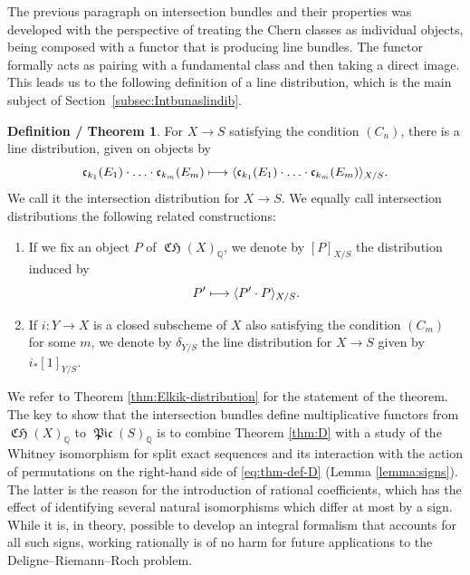 \documentclass[JEP,XML,SOM,Unicode,published]{cedram}
\newcommand\mto{\mathchoice{\longmapsto}{\mapsto}{\mapsto}{\mapsto}}
\theoremstyle{plain}
\theoremstyle{definition}
\newtheorem{defthm}[thm]{Definition / Theorem}
\newcommand{\QBbb}{\mathbb Q}
\newcommand{\cfrak}{\mathfrak c}
\DeclareMathOperator{\CHfrak}{\mathfrak{CH}}
\DeclareMathOperator{\Picfr}{\mathfrak{Pic}}
\begin{document}
The previous paragraph on intersection bundles and their properties was developed with the perspective of treating the Chern classes as individual objects, being composed with a functor that is producing line bundles. The functor formally acts as pairing with a fundamental class and then taking a direct image. This leads us to the following definition of a line distribution, which is the main subject of Section~\ref{subsec:Intbunaslindib}.

\begin{defthm}
For $X \to S$ satisfying the condition $(C_{n})$, there is a line distribution, given on objects by
\begin{equation}\label{eq:thm-def-D}
\cfrak_{k_1}(E_1) \cdot \ldots \cdot \cfrak_{k_m}(E_m) \mto \langle \cfrak_{k_1}(E_1) \cdot \ldots \cdot \cfrak_{k_m}(E_m) \rangle_{X/S}.
\end{equation}
We call it the intersection distribution for $X\to S$. We equally call intersection distributions the following related constructions:

\begin{enumerate}
\item If we fix an object $P$ of $\CHfrak(X)_\QBbb$, we denote by $[P]_{X/S}$ the distribution induced by
\begin{displaymath}
P^{\prime} \mto \langle P^{\prime} \cdot P \rangle_{X/S}.
\end{displaymath}
\item If $i\colon Y \to X$ is a closed subscheme of $X$ also satisfying the condition $(C_m)$ for some $m$, we denote by $\delta_{Y/S}$ the line distribution for $X\to S$ given by $ i_\ast [1]_{Y/S}$.
\end{enumerate}

\end{defthm}
We refer to Theorem \ref{thm:Elkik-distribution} for the statement of the theorem. The key to show that the intersection bundles define multiplicative functors from $\CHfrak(X)_{\QBbb}$ to $\Picfr(S)_{\QBbb}$ is to combine Theorem \ref{thm:D} with a study of the Whitney isomorphism for split exact sequences and its interaction with the action of permutations on the right-hand side of \eqref{eq:thm-def-D} (\cf Lemma \ref{lemma:signs}). The latter is the reason for the introduction of rational coefficients, which has the effect of identifying several natural isomorphisms which differ at most by a sign. While it is, in theory, possible to develop an integral formalism that accounts for all such signs, working rationally is of no harm for future applications to the Deligne--Riemann--Roch problem.
\end{document}

